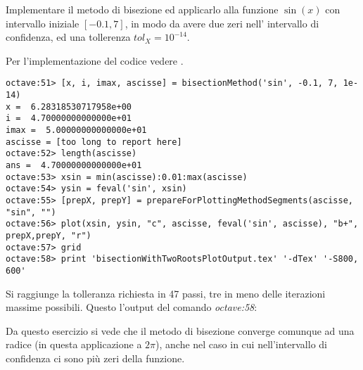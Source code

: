 \begin{exercise}
Implementare il metodo di bisezione ed applicarlo alla funzione $\sin(x)$ 
con intervallo iniziale $[-0.1, 7]$, in modo da avere due zeri nell'
intervallo di confidenza, ed una tollerenza $tol_{X} = 10^{-14}$.
\end{exercise}
Per l'implementazione del codice vedere .
\begin{lstlisting}
octave:51> [x, i, imax, ascisse] = bisectionMethod('sin', -0.1, 7, 1e-14)
x =  6.28318530717958e+00
i =  4.70000000000000e+01
imax =  5.00000000000000e+01
ascisse = [too long to report here]
octave:52> length(ascisse)
ans =  4.70000000000000e+01
octave:53> xsin = min(ascisse):0.01:max(ascisse)
octave:54> ysin = feval('sin', xsin)
octave:55> [prepX, prepY] = prepareForPlottingMethodSegments(ascisse, "sin", "")
octave:56> plot(xsin, ysin, "c", ascisse, feval('sin', ascisse), "b+", prepX,prepY, "r") 
octave:57> grid
octave:58> print 'bisectionWithTwoRootsPlotOutput.tex' '-dTex' '-S800, 600'
\end{lstlisting}
Si raggiunge la tolleranza richiesta in 47 passi, tre in meno delle iterazioni
massime possibili. Questo l'output del comando \emph{octave:58}:
\begin{center}

\end{center}

Da questo esercizio si vede che il metodo di bisezione converge comunque
ad una radice (in questa applicazione a $2\pi$), anche nel caso in cui
nell'intervallo di confidenza ci sono pi\`u zeri della funzione.




